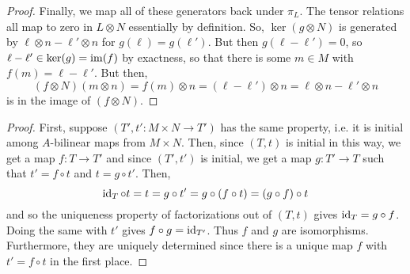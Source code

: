 \documentclass[12pt]{exam}
\begin{document}
\begin{proof}
	Finally, we map all of these generators back under $\pi_L$. The tensor relations all map to zero in $L \otimes N$ essentially by definition. So, $\ker(g \otimes N)$ is generated by $\ell \otimes n - \ell' \otimes n$ for $g(\ell)=g(\ell')$. But then $g(\ell-\ell') = 0$, so $\ell-\ell' \in \ker(g) = \operatorname{im}(f)$ by exactness, so that there is some $m \in M$ with $f(m) = \ell-\ell'$. But then,
	\[ (f \otimes N)(m \otimes n) = f(m) \otimes n = (\ell-\ell') \otimes n = \ell \otimes n - \ell' \otimes n \]
	is in the image of $(f \otimes N)$.
\end{proof}

\begin{proof}
	First, suppose $(T',t' : M \times N \to T')$ has the same property, i.e. it is initial among $A$-bilinear maps from $M \times N$. Then, since $(T,t)$ is initial in this way, we get a map $f : T \to T'$ and since $(T',t')$ is initial, we get a map $g : T' \to T$ such that $t' = f \circ t$ and $t = g \circ t'$. Then,
	\[ \operatorname{id}_T \circ t = t = g \circ t' = g \circ (f \circ t) = (g \circ f) \circ t \]
	and so the uniqueness property of factorizations out of $(T,t)$ gives $\operatorname{id}_T = g \circ f$. Doing the same with $t'$ gives $f \circ g = \operatorname{id}_{T'}$. Thus $f$ and $g$ are isomorphisms. Furthermore, they are uniquely determined since there is a unique map $f$ with $t' = f \circ t$ in the first place.
\end{proof}
\end{document}
